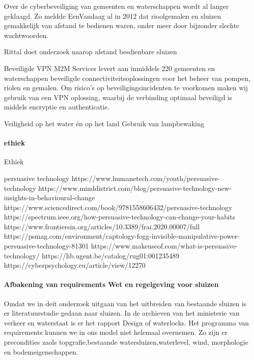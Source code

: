 \cite{cybersecWaterwerk}
Over de cyberbeveiliging van gemeenten en waterschappen wordt al langer geklaagd. Zo meldde EenVandaag al in 2012 dat rioolgemalen en sluizen gemakkelijk van afstand te bedienen waren, onder meer door bijzonder slechte wachtwoorden.

\cite{cybersecWaterschappen}
Rittal doet onderzoek naarop afstand besdienbare sluizen

\cite{cybersecZuidHolland}
Beveiligde VPN
M2M Services levert aan inmiddels 220 gemeenten en waterschappen beveiligde connectiviteitsoplossingen voor het beheer van pompen, riolen en gemalen. Om risico’s op beveiligingsincidenten te voorkomen maken wij gebruik van een VPN oplossing, waarbij de verbinding optimaal beveiligd is middels encryptie en authenticatie.

\cite{waterwerkNED}
Veiligheid op het water én op het land
Gebruik van lampbewaking 

\cite{veiligheidwaterland} 



\paragraph{ethiek}


Ethiek 



persuasive technology 
https://www.humanetech.com/youth/persuasive-technology 
\cite{humanTechpersuasiveTech}
https://www.minddistrict.com/blog/persuasive-technology-new-insights-in-behavioural-change 
https://www.sciencedirect.com/book/9781558606432/persuasive-technology 
https://spectrum.ieee.org/how-persuasive-technology-can-change-your-habits 
\cite{rezenfeld01012018persuasiveTecgHabits}
https://www.frontiersin.org/articles/10.3389/frai.2020.00007/full 
\cite{aldenaini28042020persuasiveTechTrends}
https://psmag.com/environment/captology-fogg-invisible-manipulative-power-persuasive-technology-81301 
\cite{larson14062017persuasivetechmanipulates}
https://www.makeuseof.com/what-is-persuasive-technology/ 
\cite{tanzem22012022persuasivetechchanginglives}
https://lib.ugent.be/catalog/rug01:001235489 
https://cyberpsychology.eu/article/view/12270 
\cite{tikkakuddonenpersuasiveTechnology}
\paragraph{Afbakening van requirements Wet en regelgeving voor sluizen}
Omdat we in deit onderzoek uitgaan van het uitbreiden van bestaande sluizen is er literatuurstudie gedaan naar sluizen. In de archieven van het ministerie van verkeer en waterstaat is er het rapport Design of waterlocks\cite{CivilEngineeringDivision}.
Het programma van requirements kunnen we in ons model niet helemaal overnemen. 
Zo zijn er precondities zaols topgrafie,bestaande watersluizen,waterlevel, wind, morphologie en bodemeigenschappen.

